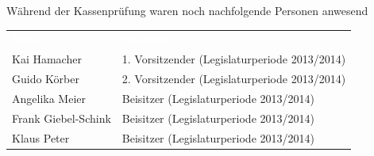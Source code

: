 \documentclass[%
	titlepage,oneside,12pt,headlines=1.5,numbers=noenddot, chapterprefix=false,parskip=full-,DIV=14,pagesize,headings=small]{scrreprt}
\begin{document}
Während der Kassenprüfung waren noch nachfolgende Personen anwesend
\renewcommand{\arraystretch}{1.2}%
\setlength{\arrayrulewidth}{1.5pt}%
%
\begin{longtable}[ht]{|p{} p{}|}
\hline\rowcolor{pirateorange} 
	\textcolor{white}{\textbf{Name}} & \textcolor{white}{\textbf{Funktion}}  \\
        Kai Hamacher & 1. Vorsitzender (Legislaturperiode 2013/2014) \\ 
        Guido Körber & 2. Vorsitzender (Legislaturperiode 2013/2014) \\
        Angelika Meier & Beisitzer (Legislaturperiode 2013/2014) \\
        Frank Giebel-Schink & Beisitzer (Legislaturperiode 2013/2014) \\
        Klaus Peter & Beisitzer (Legislaturperiode 2013/2014) \\
\hline
\end{longtable}\vspace{-1.25em}
\end{document}
